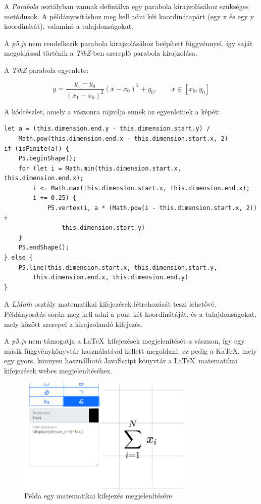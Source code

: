 A \textit{Parabola} osztályban vannak definiálva egy parabola kirajzolásához szükséges metódusok. A példányosításhoz meg kell adni két koordinátapárt (egy x és egy y koordinátát), valamint a tulajdonságokat.

A \textit{p5.js} nem rendelkezik parabola kirajzolásához beépített függvénnyel, így saját megoldással történik a \textit{TikZ}-ben szereplő parabola kirajzolása. 

A \textit{TikZ} parabola egyenlete: 

$$\displaystyle y = \frac{y_1 - y_0}{(x_1 - x_0)^2}(x - x_0)^2 + y_0, \qquad x\in[x_0, y_0]$$

A kódrészlet, amely a vászonra rajzolja ennek az egyenletnek a képét:

\begin{lstlisting}[style=es6, morekeywords={P5}]
let a = (this.dimension.end.y - this.dimension.start.y) / 
    Math.pow(this.dimension.end.x - this.dimension.start.x, 2)
if (isFinite(a)) {
	P5.beginShape();
	for (let i = Math.min(this.dimension.start.x, this.dimension.end.x); 
	    i <= Math.max(this.dimension.start.x, this.dimension.end.x); 
	    i += 0.25) {
		    P5.vertex(i, a * (Math.pow(i - this.dimension.start.x, 2)) +
		        this.dimension.start.y)
	}
	P5.endShape();
} else {
	P5.line(this.dimension.start.x, this.dimension.start.y, 
	    this.dimension.end.x, this.dimension.end.y)
}
\end{lstlisting}


A \textit{LMath} osztály matematikai kifejezések létrehozását teszi lehetővé. Példányosítás során meg kell adni a pont két koordinátáját, és a tulajdonságokat, mely között szerepel a kirajzolandó kifejezés. 

A \textit{p5.js} nem támogatja a \LaTeX\ kifejezések megjelenítését a vásznon, így egy másik függvénykönyvtár használatával kellett megoldani: ez pedig a KaTeX{\cite{katex}}, mely egy gyors, könnyen használható JavaScript könyvtár a \LaTeX\ matematikai kifejezések webes megjelenítéséhez.

\begin{figure}[!h]
	\label{fig:math}
	\centering
	\includegraphics[width=0.75\textwidth]{images/math.png}
	\caption{Példa egy matematikai kifejezés megjelenítésére}
\end{figure}

